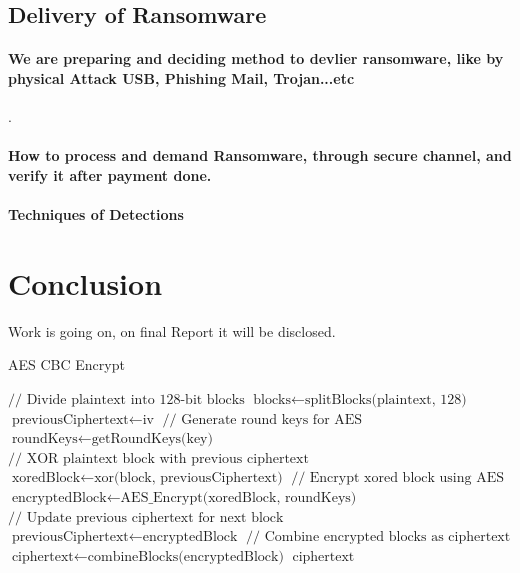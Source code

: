 \documentclass[12pt,twocolumn]{article}
\begin{document}
\subsection{Delivery of Ransomware}

\paragraph{We are preparing and deciding method to devlier ransomware, like by physical Attack USB, Phishing Mail, Trojan...etc}.

\paragraph{How to process and demand Ransomware, through secure channel, and verify it after payment done.}

\paragraph{Techniques of Detections}

\section{Conclusion}
Work is going on, on final Report it will be disclosed.

\begin{algorithm}
\caption{AES CBC Encrypt}
\begin{algorithmic}
  \State $ \text{// Divide plaintext into 128-bit blocks} $
  \State $ \text{blocks} \gets \text{splitBlocks(plaintext, 128)} $
  \State $ \text{previousCiphertext} \gets \text{iv} $
  \State $ \text{// Generate round keys for AES} $
  \State $ \text{roundKeys} \gets \text{getRoundKeys(key)} $
    \State $ \text{// XOR plaintext block with previous ciphertext} $
    \State $ \text{xoredBlock} \gets \text{xor(block, previousCiphertext)} $
    \State $ \text{// Encrypt xored block using AES} $
    \State $ \text{encryptedBlock} \gets \text{AES\_Encrypt(xoredBlock, roundKeys)} $
    \State $ \text{// Update previous ciphertext for next block} $
    \State $ \text{previousCiphertext} \gets \text{encryptedBlock} $
  \EndFor
  \State $ \text{// Combine encrypted blocks as ciphertext} $
  \State $ \text{ciphertext} \gets \text{combineBlocks(encryptedBlock)} $
  \State \Return $\text{ciphertext}$
\EndFunction
\end{algorithmic}
\end{algorithm}
\end{document}
